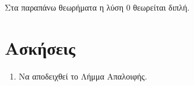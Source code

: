 \documentclass[11pt,a4paper]{book}
\begin{document}
Στα παραπάνω θεωρήματα η λύση $0$ θεωρείται διπλή.

\section*{Ασκήσεις}
\begin{enumerate}
	\item Να αποδειχθεί το Λήμμα Απαλοιφής.
\end{enumerate}

\end{document}
